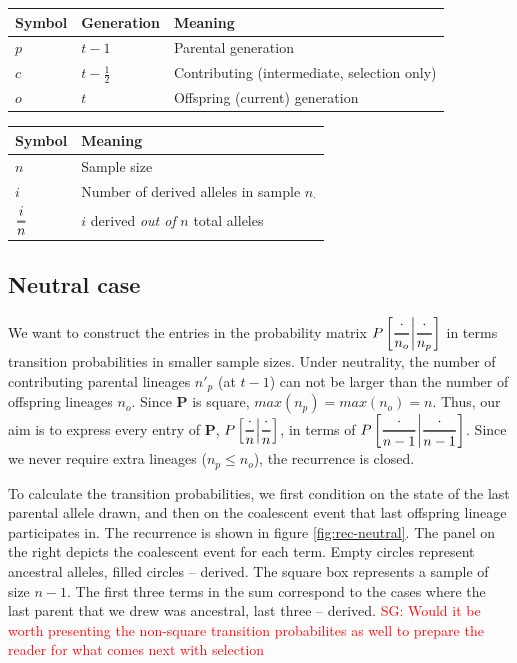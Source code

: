 \documentclass[review]{elsarticle}
\newcommand{\Dfrac}[2]{%
  \ooalign{%
    $\genfrac{}{}{1.2pt}0{#1}{#2}$\cr%
    $\color{white}\genfrac{}{}{.4pt}0{\phantom{#1}}{\phantom{#2}}$}%
}
\newcommand{\cond}{\middle\vert}
\newcommand{\sgcomment}[1]{\textcolor{red}{SG: #1}}
\begin{document}
\label{ssec:tab-symbols}
\begin{center}
\begin{tabular}{lll}
Symbol & Generation & Meaning\\
\hline
$p$ & $t-1$ & Parental generation\\
$c$ & $t-\frac{1}{2}$ & Contributing (intermediate, selection only)\\
$o$ & $t$ & Offspring (current) generation\\
\end{tabular}
\end{center}

\begin{center}
\begin{tabular}{ll}
Symbol & Meaning\\
\hline
$n$ & Sample size\\
$i$ & Number of derived alleles in sample $n_{\cdot}$\\
$\Dfrac{i}{n}$ & $i$ derived \emph{out of} $n$ total alleles\\
\end{tabular}
\end{center}

\subsection{Neutral case}

We want to construct the entries in the probability matrix
$P\left[ \Dfrac{\cdot}{n_o} \cond \Dfrac{\cdot}{n_p} \right]$ in terms transition probabilities in
smaller sample sizes. Under neutrality, the number of contributing parental lineages $n'_p$ (at
$t-1$) can not be larger than the number of offspring lineages $n_o$. Since $\mathbf{P}$ is square,
$max(n_p)=max(n_o)=n$. Thus, our aim is to express every entry of $\mathbf{P}$,
$P\left[ \Dfrac{\cdot}{n} \cond\Dfrac{\cdot}{n} \right]$, in terms of
$P\left[ \Dfrac{\cdot}{n-1} \cond \Dfrac{\cdot}{n-1} \right]$. Since we never require extra lineages
($n_p\le n_o$), the recurrence is closed.

To calculate the transition probabilities, we first condition on the state of the last parental
allele drawn, and then on the coalescent event that last offspring lineage participates in. The
recurrence is shown in figure \ref{fig:rec-neutral}. The panel on the right depicts the coalescent
event for each term. Empty circles represent ancestral alleles, filled circles -- derived. The
square box represents a sample of size $n-1$. The first three terms in the sum correspond to the
cases where the last parent that we drew was ancestral, last three -- derived.
\sgcomment{Would it be worth presenting the non-square transition probabilites as well to prepare the reader for what comes next with selection}
\end{document}
